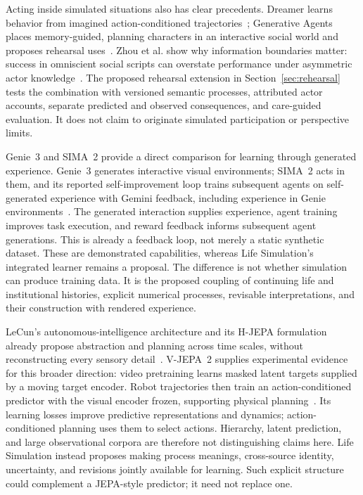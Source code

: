 \documentclass[10pt]{article}
\begin{document}
Acting inside simulated situations also has clear precedents. Dreamer learns
behavior from imagined action-conditioned trajectories~\cite{hafner2025dreamer};
Generative Agents places memory-guided, planning characters in an interactive
social world and proposes rehearsal uses~\cite{park2023}. Zhou et al. show why
information boundaries matter: success in omniscient social scripts can
overstate performance under asymmetric actor knowledge~\cite{zhou2024socialSimulation}.
The proposed rehearsal extension in Section~\ref{sec:rehearsal} tests the
combination with versioned semantic processes, attributed actor accounts,
separate predicted and observed consequences, and care-guided evaluation.
It does not claim to originate simulated participation or perspective limits.

Genie~3 and SIMA~2 provide a direct comparison for learning through generated
experience. Genie~3 generates interactive visual environments; SIMA~2 acts in
them, and its reported self-improvement loop trains subsequent agents on
self-generated experience with Gemini feedback, including experience in
Genie environments~\cite{parkerHolderFruchter2025genie3,simaTeam2025sima2}.
The generated interaction supplies experience, agent training improves task
execution, and reward feedback informs subsequent agent generations. This is
already a feedback loop, not merely a static synthetic dataset.
These are demonstrated capabilities, whereas Life Simulation's integrated
learner remains a proposal. The difference is not whether simulation can
produce training data. It is the proposed coupling of continuing life and
institutional histories, explicit numerical processes, revisable
interpretations, and their construction with rendered experience.

LeCun's autonomous-intelligence architecture and its H-JEPA formulation
already propose abstraction and planning across time scales, without
reconstructing every sensory detail~\cite{lecun2022autonomous,
dawidLecun2023latent}. V-JEPA~2 supplies experimental evidence for this broader
direction: video pretraining learns masked latent targets supplied by a moving
target encoder. Robot trajectories then train an action-conditioned predictor
with the visual encoder frozen, supporting physical
planning~\cite{assran2025vjepa2}. Its learning losses improve predictive
representations and dynamics; action-conditioned planning uses them to select
actions. Hierarchy, latent prediction, and large
observational corpora are therefore not distinguishing claims here. Life
Simulation instead proposes making process meanings, cross-source identity,
uncertainty, and revisions jointly available for learning. Such explicit
structure could complement a JEPA-style predictor; it need not replace one.
\end{document}
